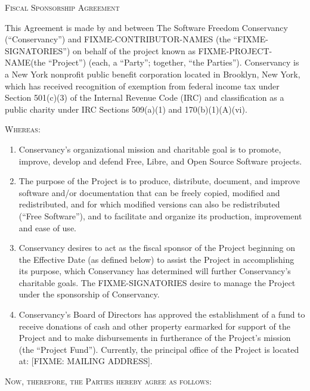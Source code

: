 \documentclass[letterpaper,12pt]{article}
\newcommand{\projectname}{FIXME-PROJECT-NAME\xspace}
\newcommand{\signatories}{FIXME-SIGNATORIES\xspace}
\begin{document}
\begin{center}
\textsc{\Huge Fiscal Sponsorship Agreement}{\Huge {} } 
\par\end{center}

\bigskip{}


This Agreement is made by and between The Software Freedom Conservancy
(``Conservancy'') and FIXME-CONTRIBUTOR-NAMES (the ``\signatories'')
on behalf of the project known as \projectname (the ``Project'') (each, a 
``Party''; together, ``the Parties'').  Conservancy is a New York nonprofit 
public benefit corporation located in Brooklyn, New York, which has received 
recognition of exemption from federal income tax under Section 501(c)(3) of 
the Internal Revenue Code (IRC) and classification as a public charity under 
IRC Sections 509(a)(1) and 170(b)(1)(A)(vi).

\textsc{Whereas:}

\begin{enumerate}[label=\Alph*.,ref=\S \Alph*]
\item Conservancy's organizational mission and charitable goal is to promote,
improve, develop and defend Free, Libre, and Open Source Software
projects. 
\item The purpose of the Project is to produce, distribute, document, and
improve software and/or documentation that can be freely copied, modified and redistributed,
and for which modified versions can also be redistributed (``Free Software''),
and to facilitate and organize its production, improvement and ease
of use. 
\item Conservancy desires to act as the fiscal sponsor of the Project beginning
on the Effective Date (as defined below) to assist the Project in
accomplishing its purpose, which Conservancy has determined will further
Conservancy's charitable goals. The \signatories desire to manage
the Project under the sponsorship of Conservancy. 
\item Conservancy's Board of Directors has approved the establishment
of a fund to receive donations of cash and other property earmarked
for support of the Project and to make disbursements in furtherance
of the Project's mission (the ``Project Fund''). Currently, the
principal office of the Project is located at: [FIXME: MAILING ADDRESS]. 
\end{enumerate}
\medskip{}


\textsc{Now, therefore, the Parties hereby agree as follows:}
\end{document}

